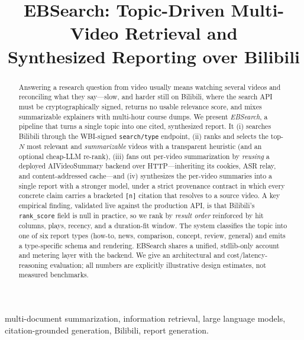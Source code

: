 \documentclass[conference]{IEEEtran}
\begin{document}
\title{EBSearch: Topic-Driven Multi-Video Retrieval and\\Synthesized Reporting over Bilibili}

\author{
}

\maketitle

\begin{abstract}
Answering a research question from video usually means watching several videos
and reconciling what they say---slow, and harder still on Bilibili, where the
search API must be cryptographically signed, returns no usable relevance score,
and mixes summarizable explainers with multi-hour course dumps. We present
\emph{EBSearch}, a pipeline that turns a single topic into one cited,
synthesized report. It (i) searches Bilibili through the WBI-signed
\texttt{search/type} endpoint, (ii) ranks and selects the top-$N$ most relevant
and \emph{summarizable} videos with a transparent heuristic (and an optional
cheap-LLM re-rank), (iii) fans out per-video summarization by \emph{reusing} a
deployed AIVideoSummary backend over HTTP---inheriting its cookies, ASR relay,
and content-addressed cache---and (iv) synthesizes the per-video summaries into a
single report with a stronger model, under a strict provenance contract in which
every concrete claim carries a bracketed \texttt{[n]} citation that resolves to a
source video. A key empirical finding, validated live against the production
API, is that Bilibili's \texttt{rank\_score} field is null in practice, so we
rank by \emph{result order} reinforced by hit columns, plays, recency, and a
duration-fit window. The system classifies the topic into one of six report
types (how-to, news, comparison, concept, review, general) and emits a
type-specific schema and rendering. EBSearch shares a unified, stdlib-only
account and metering layer with the backend. We give an architectural and
cost/latency-reasoning evaluation; all numbers are explicitly illustrative
design estimates, not measured benchmarks.
\end{abstract}

\begin{IEEEkeywords}
multi-document summarization, information retrieval, large language models,
citation-grounded generation, Bilibili, report generation.
\end{IEEEkeywords}
\end{document}
